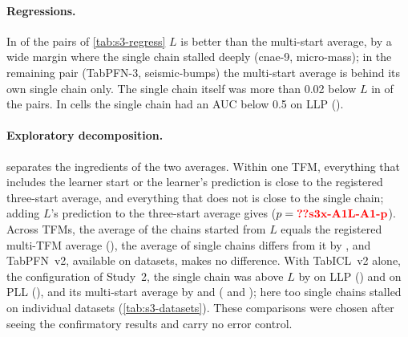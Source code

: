 \paragraph{Regressions.} In  of the  pairs of \cref{tab:s3-regress} $L$ is better
than the multi-start average, by a wide margin where the single chain stalled deeply (cnae-9, micro-mass); in the
remaining pair (TabPFN-3, seismic-bumps) the multi-start average is behind its own single chain only. The single chain
itself was more than 0.02 below $L$ in  of the  pairs. In  cells
the single chain had an AUC below 0.5 on LLP ().

\begin{table}[h]
\centering
\caption{Exploratory decomposition of Study 3 (not registered; computed after the confirmatory scoring from the stored
predictions, no chain was rerun). Mean test score over datasets (within-TFM rows: mean over the TFMs of each dataset),
and difference to the registered average with W/T/L over the  datasets and a two-sided Wilcoxon
signed-rank $p$, unadjusted (SciPy defaults: zero differences dropped; exact distribution without zeros, normal
approximation otherwise).}
\label{tab:s3-explore}
\small

\end{table}

\begin{table}[h]
\centering
\caption{Study 3, the two registered differences split by setting (descriptive; one-sided Wilcoxon signed-rank $p$,
unadjusted). The registered tests pool both settings (\cref{tab:s3}).}
\label{tab:s3-split}
\small

\end{table}

\paragraph{Exploratory decomposition.}  separates the ingredients of the two averages. Within one
TFM, everything that includes the learner start or the learner's prediction is close to the registered three-start
average, and everything that does not is close to the single chain; adding $L$'s prediction to the three-start average
gives  ($p=\val{s3x-A1L-A1-p}$). Across TFMs, the average of the chains started from $L$ equals the
registered multi-TFM average (), the average of single chains differs from it by , and
TabPFN~v2, available on  datasets, makes no difference. With TabICL~v2 alone, the configuration of
Study~2, the single chain was above $L$ by  on LLP () and
 on PLL (), and its multi-start average by
 and  ( and
); here too single chains stalled on individual datasets (\cref{tab:s3-datasets}). These
comparisons were chosen after seeing the confirmatory results and carry no error control.


